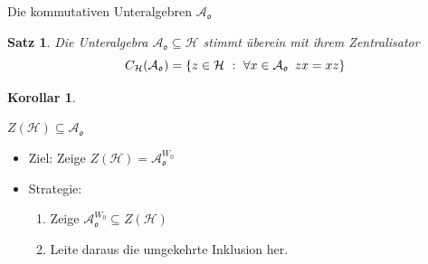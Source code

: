 \documentclass[pdf]{beamer}
\newtheorem*{satz*}{Satz}
\newtheorem*{cor*}{Korollar}
\begin{document}
\begin{frame}{Die kommutativen Unteralgebren $\mathcal{A}_{\mathfrak{o}}$}
   \begin{satz*}
      Die Unteralgebra $\mathcal{A}_{\mathfrak{o}} \subseteq \mathcal{H}$ stimmt überein mit ihrem Zentralisator
      \[ C_{\mathcal{H}}(\mathcal{A}_{\mathfrak{o}}) = \{ z \in \mathcal{H}\ :\ \forall x \in \mathcal{A}_{\mathfrak{o}}\enskip zx = xz\} \]
   \end{satz*}
   \pause \begin{cor*}
      \begin{center}$Z(\mathcal{H}) \subseteq \mathcal{A}_{\mathfrak{o}}$\end{center}
   \end{cor*}
   \pause\begin{itemize}
      \item Ziel: Zeige $Z(\mathcal{H}) = \mathcal{A}_{\mathfrak{o}}^{W_0}$
      \item<4-> Strategie:
         \begin{enumerate}
            \item<5-> Zeige $\mathcal{A}_{\mathfrak{o}}^{W_0} \subseteq Z(\mathcal{H})$
            \item<6-> Leite daraus die umgekehrte Inklusion her.
         \end{enumerate}
   \end{itemize}
\end{frame}
\end{document}
